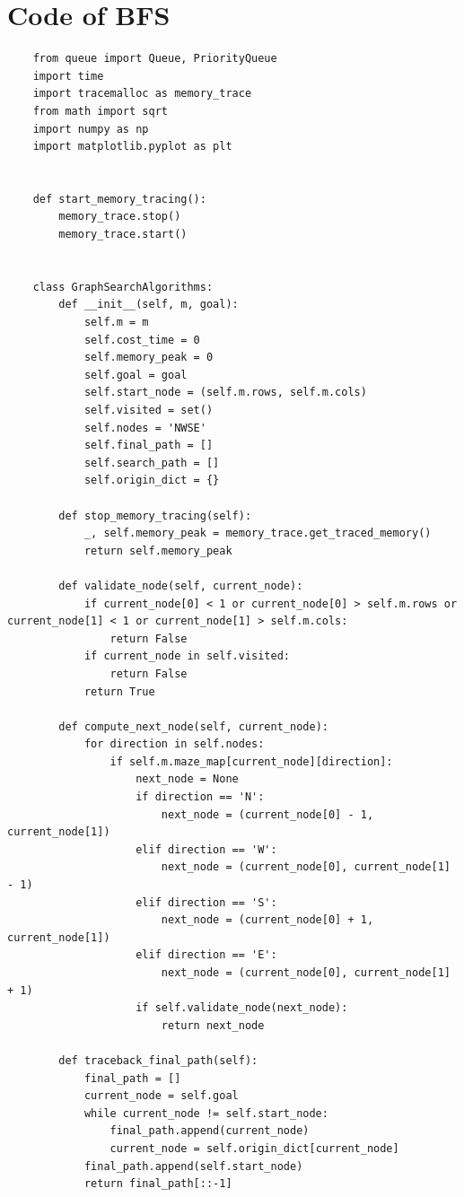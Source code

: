 \documentclass{article}
\begin{document}
\section{Code of BFS}
\begin{lstlisting}
    from queue import Queue, PriorityQueue
    import time
    import tracemalloc as memory_trace
    from math import sqrt
    import numpy as np
    import matplotlib.pyplot as plt
    
    
    def start_memory_tracing():
        memory_trace.stop()
        memory_trace.start()
    
    
    class GraphSearchAlgorithms:
        def __init__(self, m, goal):
            self.m = m
            self.cost_time = 0
            self.memory_peak = 0
            self.goal = goal
            self.start_node = (self.m.rows, self.m.cols)
            self.visited = set()
            self.nodes = 'NWSE'
            self.final_path = []
            self.search_path = []
            self.origin_dict = {}
    
        def stop_memory_tracing(self):
            _, self.memory_peak = memory_trace.get_traced_memory()
            return self.memory_peak
    
        def validate_node(self, current_node):
            if current_node[0] < 1 or current_node[0] > self.m.rows or current_node[1] < 1 or current_node[1] > self.m.cols:
                return False
            if current_node in self.visited:
                return False
            return True
    
        def compute_next_node(self, current_node):
            for direction in self.nodes:
                if self.m.maze_map[current_node][direction]:
                    next_node = None
                    if direction == 'N':
                        next_node = (current_node[0] - 1, current_node[1])
                    elif direction == 'W':
                        next_node = (current_node[0], current_node[1] - 1)
                    elif direction == 'S':
                        next_node = (current_node[0] + 1, current_node[1])
                    elif direction == 'E':
                        next_node = (current_node[0], current_node[1] + 1)
                    if self.validate_node(next_node):
                        return next_node
    
        def traceback_final_path(self):
            final_path = []
            current_node = self.goal
            while current_node != self.start_node:
                final_path.append(current_node)
                current_node = self.origin_dict[current_node]
            final_path.append(self.start_node)
            return final_path[::-1]
    

\end{lstlisting}
\end{document}
